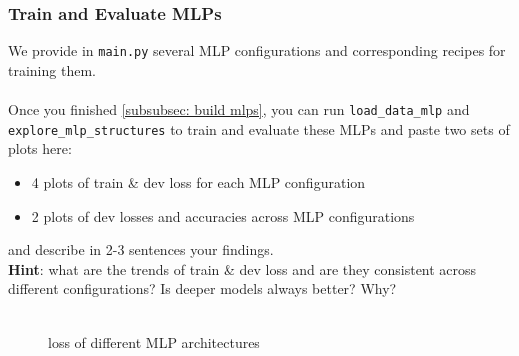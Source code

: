 \subsubsection{Train and Evaluate MLPs}
We provide in \texttt{main.py} several MLP configurations and corresponding recipes for training them.\\\\
\noindent\todo{} Once you finished \autoref{subsubsec: build mlps}, you can run \texttt{load\_data\_mlp} and \texttt{explore\_mlp\_structures} to train and evaluate these MLPs and paste two sets of plots here:
\begin{itemize}
    \item 4 plots of train \& dev loss for each MLP configuration
    \item 2 plots of dev losses and accuracies across MLP configurations
\end{itemize}
and describe in 2-3 sentences your findings.\\
\noindent \textbf{Hint}: what are the trends of train \& dev loss and are they consistent across different configurations? Is deeper models always better? Why?\\
\noindent {\color{red}{your plots and answer:}}\\
\begin{figure}[h] 
    \centering
    \hfill
    \hfill
    \hfill
    \caption{loss of different MLP architectures}
\end{figure}
